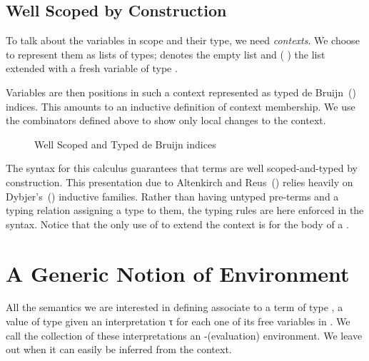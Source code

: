 \subsection{Well Scoped by Construction}

To talk about the variables in scope and their type, we need \emph{contexts}. We
choose to represent them as lists of types; \AIC{[]} denotes the empty list and
(  ) the list  extended with a fresh variable of type .


\begin{figure}[h]
\caption{\label{fig:scoped}}
\end{figure}


Variables are then positions in such a context represented as typed de
Bruijn~(\citeyear{de1972lambda}) indices. This amounts to an inductive definition
of context membership. We use the combinators defined above to show only local
changes to the context.

\begin{figure}[h]
\caption{Well Scoped and Typed de Bruijn indices\label{fig:variable}}
\end{figure}

The syntax for this calculus guarantees that terms are well scoped-and-typed
by construction. This presentation due to
Altenkirch and Reus~(\citeyear{altenkirch1999monadic}) relies heavily on
Dybjer's~(\citeyear{dybjer1991inductive}) inductive families. Rather than
having untyped pre-terms and a typing relation assigning a type to
them, the typing rules are here enforced in the syntax. Notice that
the only use of  to extend the context is for the body of
a .

\begin{figure}
\caption{\label{fig:term}}
\end{figure}

\section{A Generic Notion of Environment}

All the semantics we are interested in defining associate to a term 
of type   , a value of type    given
an interpretation   {τ} for each one of its free variables
 in . We call the collection of these interpretations an
-(evaluation) environment. We leave out  when it can easily
be inferred from the context.

